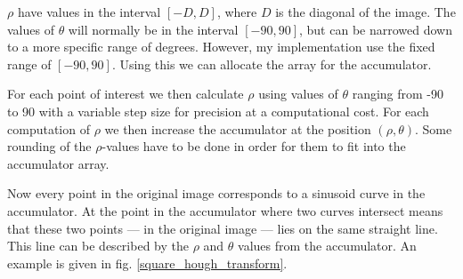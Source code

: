 \documentclass[a4paper, 10pt, final]{article}
\begin{document}
$\rho$ have values in the interval $[-D, D]$, where $D$ is the diagonal
of the image. The values of $\theta$ will normally be in the interval
$[-90, 90]$, but can be narrowed down to a more specific range of
degrees. However, my implementation use the fixed range of $[-90,90]$.
Using this we can allocate the array for the accumulator.

For each point of interest we then calculate $\rho$ using values of
$\theta$ ranging from -90 to 90 with a variable step size for precision
at a computational cost. For each computation of $\rho$ we then
increase the accumulator at the position $(\rho, \theta)$. Some rounding
of the $\rho$-values have to be done in order for them to fit into the
accumulator array.

Now every point in the original image corresponds to a sinusoid curve in
the accumulator. At the point in the accumulator where two curves
intersect means that these two points --- in the original image --- lies
on the same straight line. This line can be described by the $\rho$ and
$\theta$ values from the accumulator. An example is given in fig.
\ref{square_hough_transform}.
\end{document}
